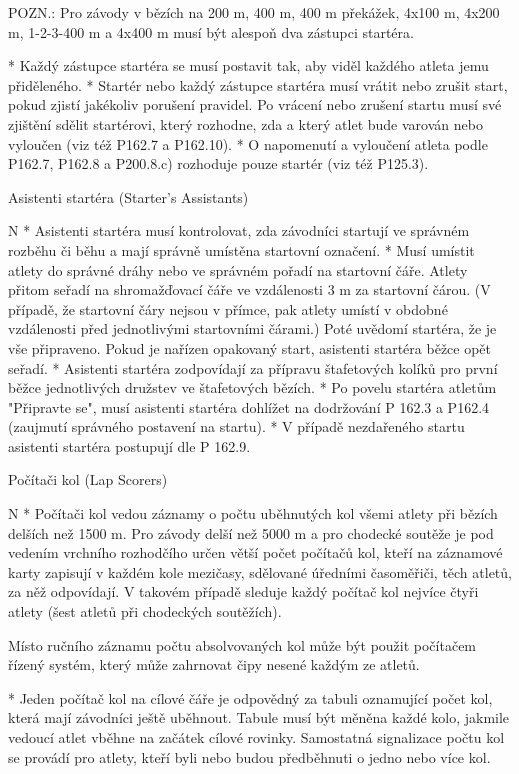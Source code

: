 POZN.: Pro závody v bězích na 200 m, 400 m, 400 m překážek, 4x100 m, 4x200 m, 1-2-3-400 m a 4x400 m musí být alespoň dva zástupci startéra.

* Každý zástupce startéra se musí postavit tak, aby viděl každého atleta jemu přiděleného.
* Startér nebo každý zástupce startéra musí vrátit nebo zrušit start, pokud zjistí jakékoliv porušení pravidel. Po vrácení nebo zrušení startu musí své zjištění sdělit startérovi, který rozhodne, zda a který atlet bude varován nebo vyloučen (viz též P162.7 a P162.10).
* O napomenutí a vyloučení atleta podle P162.7, P162.8 a P200.8.c) rozhoduje pouze startér (viz též P125.3).
\enditems

\secc Asistenti startéra (Starter’s Assistants)

\begitems \style N
* Asistenti startéra musí kontrolovat, zda závodníci startují ve správném rozběhu či běhu a mají správně umístěna startovní označení.
* Musí umístit atlety do správné dráhy nebo ve správném pořadí na startovní čáře. Atlety přitom seřadí na shromažďovací čáře ve vzdálenosti 3 m za startovní čárou. (V případě, že startovní čáry nejsou v přímce, pak atlety umístí v obdobné vzdálenosti před jednotlivými startovními čárami.) Poté uvědomí startéra, že je vše připraveno. Pokud je nařízen opakovaný start, asistenti startéra běžce opět seřadí.
* Asistenti startéra zodpovídají za přípravu štafetových kolíků pro první běžce jednotlivých družstev ve štafetových bězích.
* Po povelu startéra atletům "Připravte se", musí asistenti startéra dohlížet na dodržování P 162.3 a P162.4 (zaujmutí správného postavení na startu).
* V případě nezdařeného startu asistenti startéra postupují dle P 162.9.
\enditems

\secc Počítači kol (Lap Scorers)

\begitems \style N
* Počítači kol vedou záznamy o počtu uběhnutých kol všemi atlety při bězích delších než 1500 m. Pro závody delší než 5000 m a pro chodecké soutěže je pod vedením vrchního rozhodčího určen větší počet počítačů kol, kteří na záznamové karty zapisují v každém kole mezičasy, sdělované úředními časoměřiči, těch atletů, za něž odpovídají. V takovém případě sleduje každý počítač kol nejvíce čtyři atlety (šest atletů při chodeckých soutěžích).

Místo ručního záznamu počtu absolvovaných kol může být použit počítačem řízený systém, který může zahrnovat čipy nesené každým ze atletů.

* Jeden počítač kol na cílové čáře je odpovědný za tabuli oznamující počet kol, která mají závodníci ještě uběhnout. Tabule musí být měněna každé kolo, jakmile vedoucí atlet vběhne na začátek cílové rovinky. Samostatná signalizace počtu kol se provádí pro atlety, kteří byli nebo budou předběhnuti o jedno nebo více kol.

